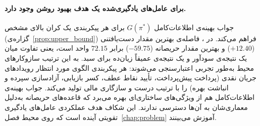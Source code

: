 \paragraph{برای عامل‌های یادگیری‌شده یک هدف بهبود روشن وجود دارد.}
جواب بهینه‌ی اطلاعات‌کامل $G(\pi^*)$ برای هر پیکربندی یک کران بالای
مشخص (گزاره‌ی~\ref{prop:upper_bound}) فراهم می‌کند. در
، فاصله‌ی بهترین مقدار دست‌یافتنی ($+12.40$) و بهترین
مقدار حریصانه ($-59.75$) برابر $72.15$ واحد  است، یعنی تفاوت
میان یک نتیجه‌ی سودآور و یک نتیجه‌ی عمیقاً زیان‌ده برای سبد. به این
ترتیب سازوکارهای محیط به‌طور تجربی اعتبارسنجی می‌شوند: هر پیکربندی
الگوی مورد انتظار رویدادهای جریان نقدی (پرداخت پیش‌پرداخت، تأیید نقاط
عطف، کسر بازیابی، آزادسازی سپرده و انباشت بهره) را با ترتیب درست و
سازگاری مالی تولید می‌کند. جواب بهینه‌ی اطلاعات‌کامل هم از ویژگی‌های
ساختاری‌ای بهره می‌برد که قاعده‌های حریصانه به‌دلیل معماری‌شان به آن‌ها
دسترسی ندارند. این شکاف هدف عملکردی عامل‌های یادگیری تقویتی آینده است
که روی محیط فصل~\ref{chap:problem} آموزش می‌بینند.